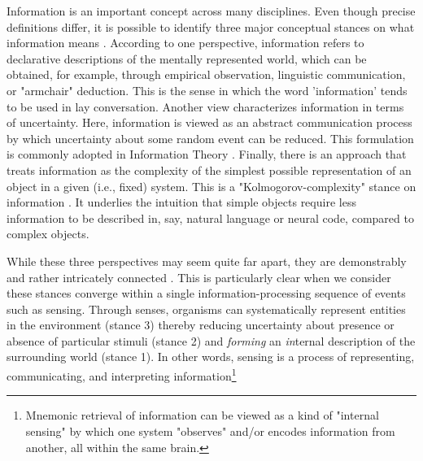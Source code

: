 Information is an important concept across many disciplines. Even though precise definitions differ, it is possible to identify three major conceptual stances on what information means \cite{adriaans_introduction_2008}. According to one perspective, information refers to declarative descriptions of the mentally represented world, which can be obtained, for example, through empirical observation, linguistic communication, or "armchair" deduction. This is the sense in which the word 'information' tends to be used in lay conversation. Another view characterizes information in terms of uncertainty. Here, information is viewed as an abstract communication process by which uncertainty about some random event can be reduced. This formulation is commonly adopted in Information Theory \cite{shannon_mathematical_1948}. Finally, there is an approach that treats information as the complexity of the simplest possible representation of an object in a given (i.e., fixed) system. This is a "Kolmogorov-complexity" stance on information \cite{kolmogorov1965three}. It underlies the intuition that simple objects require less information to be described in, say, natural language or neural code, compared to complex objects.

While these three perspectives may seem quite far apart, they are demonstrably and rather intricately connected \cite{adriaans_introduction_2008}. This is particularly clear when we consider these stances converge within a single information-processing sequence of events such as sensing. Through senses, organisms can systematically represent entities in the environment (stance 3) thereby reducing uncertainty about presence or absence of particular stimuli (stance 2) and \emph{forming} an \emph{in}ternal description of the surrounding world (stance 1). In other words, sensing is a process of representing, communicating, and interpreting information\footnote{Mnemonic retrieval of information can be viewed as a kind of "internal sensing" by which one system "observes" and/or encodes information from another, all within the same brain.}

